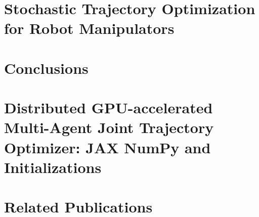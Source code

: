\documentclass[11pt]{book}
\begin{document}

\chapter{Stochastic Trajectory Optimization for Robot Manipulators}
\label{ch:bl_arm}



\chapter{Conclusions}
\label{ch:conc}



\appendix

\chapter{Distributed GPU-accelerated Multi-Agent Joint Trajectory Optimizer: JAX NumPy and Initializations}
\label{ch:appendix-gpu-mat}


\chapter*{Related Publications}
\label{ch:relatedPubs}




 
\end{document}
